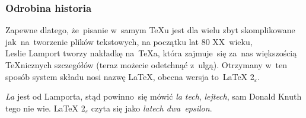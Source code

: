 \documentclass[10pt]{beamer}  %
\begin{document}
\begin{frame}
  \frametitle{Odrobina historia}

  Zapewne dlatego, że~pisanie w~samym \TeX u jest dla wielu zbyt
  skomplikowane
  jak~na~tworzenie plików tekstowych, na początku lat 80 XX~wieku, \\
  Leslie Lamport tworzy nakładkę na~\TeX a, która zajmuje~się za~nas
  większością \TeX nicznych szczegółów (teraz możecie odetchnąć
  z~ulgą). Otrzymany w~ten sposób system składu nosi nazwę \LaTeX,
  obecna wersja to~\LaTeX{} 2$_{ \varepsilon }$.

  \emph{La} jest od Lamporta, stąd powinno~się mówić \emph{la\dywiz
    tech}, \emph{lej\dywiz tech}, sam Donald Knuth tego nie wie.
  \LaTeX{} 2$_{ \varepsilon }$ czyta się jako \emph{la\dywiz tech dwa~epsilon}.

\end{frame}
\end{document}

